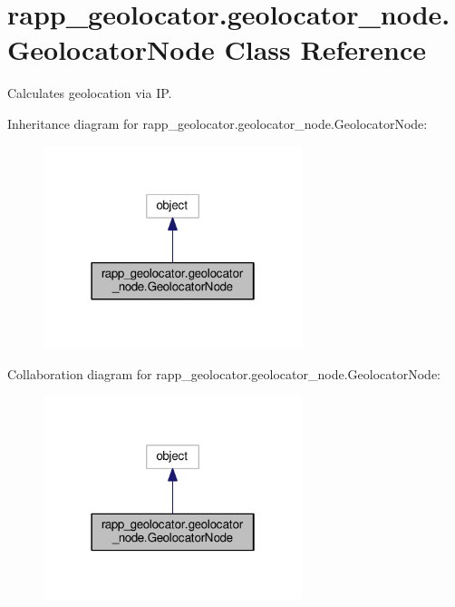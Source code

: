 \hypertarget{classrapp__geolocator_1_1geolocator__node_1_1GeolocatorNode}{\section{rapp\-\_\-geolocator.\-geolocator\-\_\-node.\-Geolocator\-Node Class Reference}
\label{classrapp__geolocator_1_1geolocator__node_1_1GeolocatorNode}
}


Calculates geolocation via I\-P.  




Inheritance diagram for rapp\-\_\-geolocator.\-geolocator\-\_\-node.\-Geolocator\-Node\-:
\nopagebreak
\begin{figure}[H]
\begin{center}
\leavevmode
\includegraphics[width=214pt]{classrapp__geolocator_1_1geolocator__node_1_1GeolocatorNode__inherit__graph}
\end{center}
\end{figure}


Collaboration diagram for rapp\-\_\-geolocator.\-geolocator\-\_\-node.\-Geolocator\-Node\-:
\nopagebreak
\begin{figure}[H]
\begin{center}
\leavevmode
\includegraphics[width=214pt]{classrapp__geolocator_1_1geolocator__node_1_1GeolocatorNode__coll__graph}
\end{center}
\end{figure}
